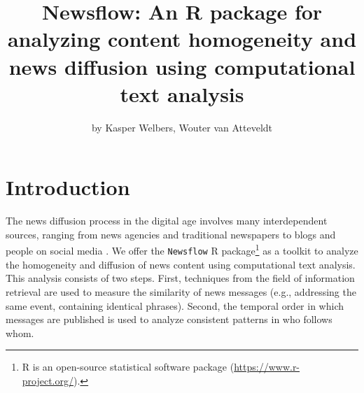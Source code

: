 \title{Newsflow: An R package for analyzing content homogeneity and news
diffusion using computational text analysis}
\author{by Kasper Welbers, Wouter van Atteveldt}

\maketitle


\section{Introduction}\label{introduction}

The news diffusion process in the digital age involves many
interdependent sources, ranging from news agencies and traditional
newspapers to blogs and people on social media
\citep{meraz11, paterson05, pew10}. We offer the \texttt{Newsflow} R
package\footnote{R is an open-source statistical software package
  (\url{https://www.r-project.org/}).} as a toolkit to analyze the
homogeneity and diffusion of news content using computational text
analysis. This analysis consists of two steps. First, techniques from
the field of information retrieval are used to measure the similarity of
news messages (e.g., addressing the same event, containing identical
phrases). Second, the temporal order in which messages are published is
used to analyze consistent patterns in who follows whom.

